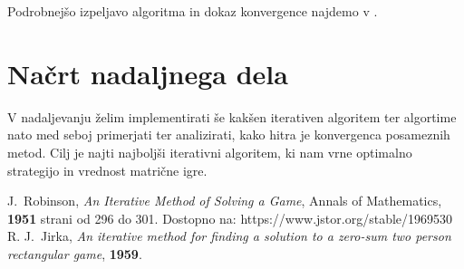 \documentclass[a4paper,12pt]{article}
\begin{document}
Podrobnejšo izpeljavo algoritma in dokaz konvergence najdemo v \cite{vir2}.
\section{Načrt nadaljnega dela}
V nadaljevanju želim implementirati še kakšen iterativen algoritem ter algortime nato med seboj primerjati ter analizirati, kako hitra 
je konvergenca posameznih metod. Cilj je najti najboljši iterativni algoritem, ki nam vrne optimalno strategijo in vrednost matrične igre. 
 
\begin{thebibliography}{99}
    J.~Robinson, \emph{An Iterative Method of Solving a Game},  Annals of Mathematics, \textbf{1951}  strani od 296 do 301. Dostopno na: https://www.jstor.org/stable/1969530
  R. J.~Jirka, \emph{An iterative method for finding a solution to a zero-sum two person rectangular game}, \textbf{1959}.
\end{thebibliography}
    
\end{document}
